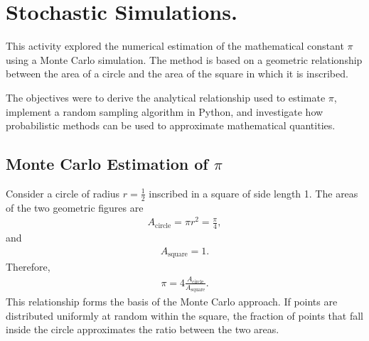 \documentclass[../portafolio.tex]{subfiles}
\begin{document}
\section{
Stochastic Simulations.}   %


\medskip


This activity explored the numerical estimation of the mathematical constant $\pi$ using a Monte Carlo simulation. The method is based on a geometric relationship between the area of a circle and the area of the square in which it is inscribed.

The objectives were to derive the analytical relationship used to estimate $\pi$, implement a random sampling algorithm in Python, and investigate how probabilistic methods can be used to approximate mathematical quantities.


\subsection{Monte Carlo Estimation of \texorpdfstring{$\pi$}{π}}

Consider a circle of radius $r=\frac{1}{2}$ inscribed in a square of side length 1. The areas of the two geometric figures are
\begin{align*}
A_{\text{circle}} = \pi r^2 = \frac{\pi}{4},
\end{align*}
and
\begin{align*}
A_{\text{square}} = 1.
\end{align*}
Therefore,
\begin{align*}
\pi = 4 \frac{A_{\text{circle}}}{A_{\text{square}}}.
\end{align*}
This relationship forms the basis of the Monte Carlo approach. If points are distributed uniformly at random within the square, the fraction of points that fall inside the circle approximates the ratio between the two areas.
\end{document}
